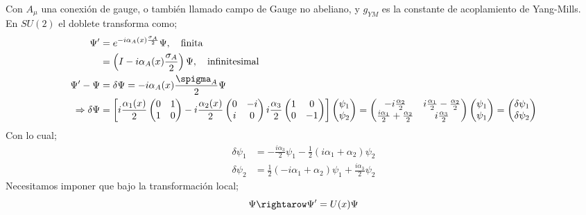 \documentclass[../main.tex]{subfiles}
\begin{document}
Con $A_\mu$ una conexión de gauge, o también llamado campo de Gauge no abeliano, y $g_{YM}$ es la constante de acoplamiento de Yang-Mills.  \\
En $SU(2)$ el doblete transforma como;
\begin{align*}
  \Psi'&=e^{-i\alpha_A(x)\frac{\sigma_A}{2}} \Psi,\quad \text{finita} \\
  & = \left( I - i\alpha_A(x)\frac{\sigma_A}{2} \right) \Psi, \quad \text{infinitesimal} \\
  \Psi'-\Psi & = \delta \Psi = -i\alpha_A(x) \frac{\spigma_A}{2} \Psi \\
  \Rightarrow \delta \Psi & = \left[ i\frac{\alpha_1(x)}{2} \begin{pmatrix}
    0 & 1 \\ 1 & 0
  \end{pmatrix}
  - i\frac{\alpha_2(x)}{2} \begin{pmatrix}
    0 & -i \\ i & 0
  \end{pmatrix}
  i \frac{\alpha_3}{2} \begin{pmatrix}
    1 & 0 \\ 0 & -1
  \end{pmatrix}
  \right] \begin{pmatrix}
    \psi_1 \\ \psi_2
  \end{pmatrix} = \begin{pmatrix}
    -i\frac{\alpha_2}{2} & i\frac{\alpha_1}{2} - \frac{\alpha_2}{2} \\ \frac{i\alpha_1}{2} + \frac{\alpha_2}{2} & i\frac{\alpha_3}{2}
  \end{pmatrix} \begin{pmatrix}
    \psi_1 \\  \psi_1
  \end{pmatrix} = \begin{pmatrix}
    \delta \psi_1 \\ \delta \psi_2
  \end{pmatrix}
\end{align*}
Con lo cual;
\begin{align*}
  \delta \psi_1 & = -\frac{i\alpha_3}{2}\psi_1 - \frac{1}{2} \left( i\alpha_1 + \alpha_2 \right)\psi_2 \\
  \delta \psi_2 & = \frac{1}{2} \left( -i\alpha_1 + \alpha_2 \right)\psi_1 + \frac{i\alpha_3}{2}\psi_2
\end{align*}
Necesitamos imponer que bajo la transformación local;
\begin{equation}
  \Psi\rightarow \Psi' = U(x) \Psi
 \end{equation}
\end{document}

